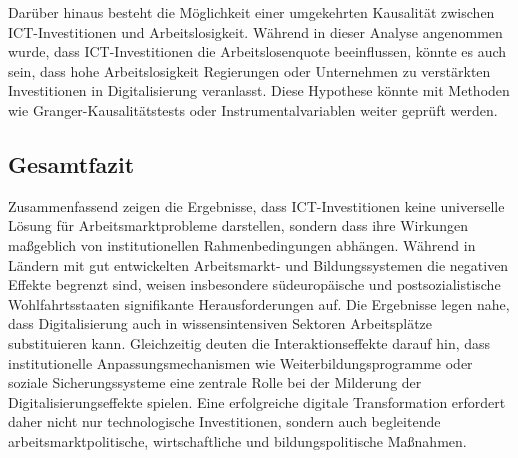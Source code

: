Darüber hinaus besteht die Möglichkeit einer umgekehrten Kausalität zwischen \ac{ICT}-Investitionen 
und Arbeitslosigkeit. Während in dieser Analyse angenommen wurde, dass \ac{ICT}-Investitionen 
die Arbeitslosenquote beeinflussen, könnte es auch sein, dass hohe Arbeitslosigkeit 
Regierungen oder Unternehmen zu verstärkten Investitionen in Digitalisierung veranlasst. 
Diese Hypothese könnte mit Methoden wie Granger-Kausalitätstests oder Instrumentalvariablen 
weiter geprüft werden.

\subsection{Gesamtfazit}

Zusammenfassend zeigen die Ergebnisse, dass \ac{ICT}-Investitionen keine universelle 
Lösung für Arbeitsmarktprobleme darstellen, sondern dass ihre Wirkungen maßgeblich von 
institutionellen Rahmenbedingungen abhängen. Während in Ländern mit gut entwickelten 
Arbeitsmarkt- und Bildungssystemen die negativen Effekte begrenzt sind, weisen insbesondere 
südeuropäische und postsozialistische Wohlfahrtsstaaten signifikante Herausforderungen auf.
Die Ergebnisse legen nahe, dass Digitalisierung auch in wissensintensiven Sektoren Arbeitsplätze 
substituieren kann. Gleichzeitig deuten die Interaktionseffekte darauf hin, dass 
institutionelle Anpassungsmechanismen wie Weiterbildungsprogramme oder soziale Sicherungssysteme 
eine zentrale Rolle bei der Milderung der Digitalisierungseffekte spielen. Eine erfolgreiche 
digitale Transformation erfordert daher nicht nur technologische Investitionen, sondern auch 
begleitende arbeitsmarktpolitische, wirtschaftliche und bildungspolitische Maßnahmen.
